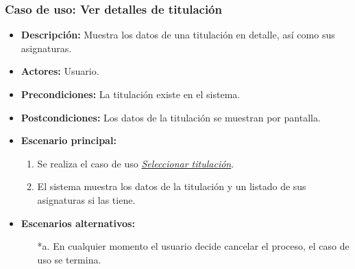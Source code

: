 \documentclass{book}
\begin{document}
\subsubsection*{Caso de uso: Ver detalles de titulación}
\begin{itemize}
\item{\bf Descripción:} Muestra los datos de una titulación en detalle, así como sus asignaturas.
\item{\bf Actores:} Usuario.
\item{\bf Precondiciones:} La titulación existe en el sistema.
\item{\bf Postcondiciones:} Los datos de la titulación se muestran por pantalla.
\item{\bf Escenario principal:}
	\begin{enumerate}
	\item Se realiza el caso de uso {\em\hyperref[select_titulacion]{Seleccionar titulación}}.
	\item El sistema muestra los datos de la titulación y un listado de sus asignaturas si las tiene.
	\end{enumerate}
\item{\bf Escenarios alternativos:}
	\begin{itemize}
	\item[*a.] En cualquier momento el usuario decide cancelar el proceso, el caso de uso se termina.
	\end{itemize}
\end{itemize}
\end{document}
